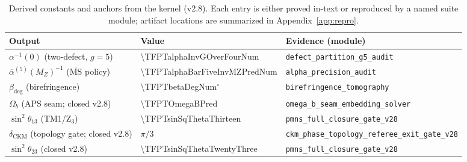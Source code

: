 \begin{table}[H]
\centering
\begin{tabular}{@{}lll@{}}
\toprule
Output & Value & Evidence (module) \\
\midrule
$\alpha^{-1}(0)$ (two-defect, $g=5$) & \num[round-mode=places,round-precision=12]{\TFPTalphaInvGOverFourNum} & \texttt{defect\_partition\_g5\_audit} \\
$\overline{\alpha}^{(5)}(M_Z)^{-1}$ ($\overline{\mathrm{MS}}$ policy) & \num[round-mode=places,round-precision=6]{\TFPTalphaBarFiveInvMZPredNum} & \texttt{alpha\_precision\_audit} \\
$\beta_{\mathrm{deg}}$ (birefringence) & \num[round-mode=places,round-precision=4]{\TFPTbetaDegNum}$^\circ$ & \texttt{birefringence\_tomography} \\
$\Omega_b$ (APS seam; closed v2.8) & \num[round-mode=places,round-precision=6]{\TFPTOmegaBPred} & \texttt{omega\_b\_seam\_embedding\_solver} \\
$\sin^2\theta_{13}$ (TM1/Z$_3$) & \num[round-mode=places,round-precision=6]{\TFPTsinSqThetaThirteen} & \texttt{pmns\_full\_closure\_gate\_v28} \\
$\delta_{\mathrm{CKM}}$ (topology gate; closed v2.8) & $\pi/3$ & \texttt{ckm\_phase\_topology\_referee\_exit\_gate\_v28} \\
$\sin^2\theta_{23}$ (closed v2.8) & \num[round-mode=places,round-precision=6]{\TFPTsinSqThetaTwentyThree} & \texttt{pmns\_full\_closure\_gate\_v28} \\
\bottomrule
\end{tabular}
\caption{Derived constants and anchors from the kernel (v2.8). Each entry is either proved in-text or reproduced by a named suite module; artifact locations are summarized in Appendix~\ref{app:repro}.}
\label{tab:constant-factory}
\end{table}

